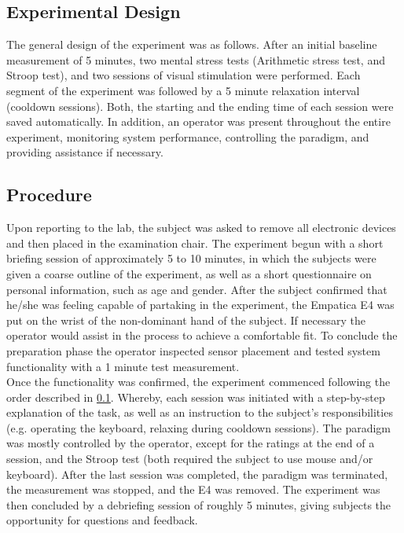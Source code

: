 \subsection{Experimental Design}\label{expdes}
The general design of the experiment was as follows.
After an initial baseline measurement of 5 minutes, two mental stress tests (Arithmetic stress test, and Stroop test), and two sessions of visual stimulation were performed. Each segment of the experiment was followed by a 5 minute relaxation interval (cooldown sessions). Both, the starting and the ending time of each session were saved automatically. In addition, an operator was present throughout the entire experiment, monitoring system performance, controlling the paradigm, and providing assistance if necessary.
\subsection{Procedure}
Upon reporting to the lab, the subject was asked to remove all electronic devices and then placed in the examination chair. The experiment begun with a short briefing session of approximately 5 to 10 minutes, in which the subjects were given a coarse outline of the experiment, as well as a short questionnaire on personal information, such as age and gender. After the subject confirmed that he/she was feeling capable of partaking in the experiment, the Empatica E4 was put on the wrist of the non-dominant hand of the subject. If necessary the operator would assist in the process to achieve a comfortable fit. To conclude the preparation phase the operator inspected sensor placement and tested system functionality with a 1 minute test measurement.\\
Once the functionality was confirmed, the experiment commenced following the order described in \ref{expdes}. Whereby, each session was initiated with a step-by-step explanation of the task, as well as an instruction to the subject's responsibilities (e.g. operating the keyboard, relaxing during cooldown sessions). The paradigm was mostly controlled by the operator, except for the ratings at the end of a session, and the Stroop test (both required the subject to use mouse and/or keyboard).
After the last session was completed, the paradigm was terminated, the measurement was stopped, and the E4 was removed.
The experiment was then concluded by a debriefing session of roughly 5 minutes, giving subjects the opportunity for questions and feedback.



